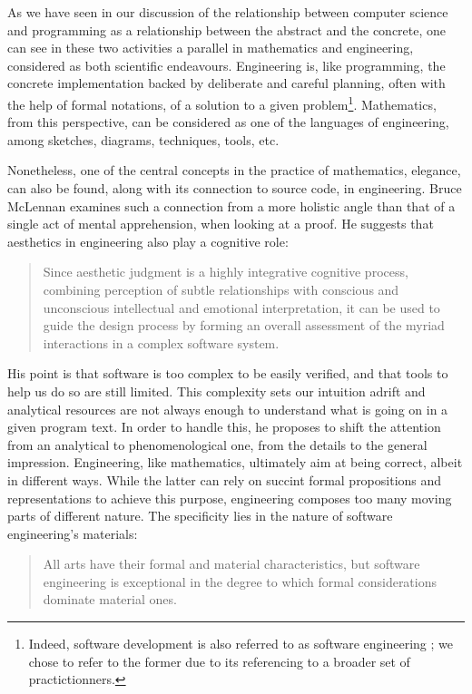 As we have seen in our discussion of the relationship between computer science and programming as a relationship between the abstract and the concrete, one can see in these two activities a parallel in mathematics and engineering, considered as both scientific endeavours. Engineering is, like programming, the concrete implementation backed by deliberate and careful planning, often with the help of formal notations, of a solution to a given problem\footnote{Indeed, software development is also referred to as software engineering \citep{bourque_swebok_2014}; we chose to refer to the former due to its referencing to a broader set of practictionners.}. Mathematics, from this perspective, can be considered as one of the languages of engineering, among sketches, diagrams, techniques, tools, etc.

Nonetheless, one of the central concepts in the practice of mathematics, elegance, can also be found, along with its connection to source code, in engineering. Bruce McLennan examines such a connection from a more holistic angle than that of a single act of mental apprehension, when looking at a proof. He suggests that aesthetics in engineering also play a cognitive role:

\begin{quote}
  Since aesthetic judgment is a highly integrative cognitive process, combining perception of subtle relationships with conscious and unconscious intellectual and emotional interpretation, it can be used to guide the design process by forming an overall assessment of the myriad interactions in a complex software system. \citep{schummer_aesthetic_2009}
\end{quote}

His point is that software is too complex to be easily verified, and that tools to help us do so are still limited. This complexity sets our intuition adrift and analytical resources are not always enough to understand what is going on in a given program text. In order to handle this, he proposes to shift the attention from an analytical to phenomenological one, from the details to the general impression. Engineering, like mathematics, ultimately aim at being correct, albeit in different ways. While the latter can rely on succint formal propositions and representations to achieve this purpose, engineering composes too many moving parts of different nature. The specificity lies in the nature of software engineering's materials:

\begin{quote}
  All arts have their formal and material characteristics, but software engineering is exceptional in the degree to which formal considerations dominate material ones. \citep{schummer_aesthetic_2009}
\end{quote}

